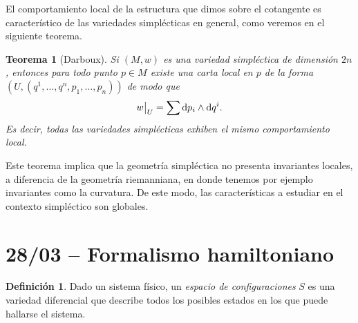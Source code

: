 \documentclass[11pt, a4paper]{article}
\theoremstyle{plain}
\newtheorem{thm}[prop]{Teorema}
\theoremstyle{definition}
\newtheorem{defn}[prop]{Definición}
\begin{document}
El comportamiento local de la estructura que dimos sobre el cotangente es característico de las variedades simplécticas en general, como veremos en el siguiente teorema.

\begin{thm}[Darboux] Si $(M,w)$ es una variedad simpléctica de dimensión $2n$, entonces para todo punto $p\in M$ existe una carta local en $p$ de la forma $\left(U, (q^1,\dots,q^n,p_1,\dots,p_n)\right)$ de modo que
\[w\big{|}_U = \sum \mathrm{d}p_i\wedge \mathrm{d}q^i.\]
Es decir, todas las variedades simplécticas exhiben el mismo comportamiento local. \hfill\qedsymbol
\end{thm}

Este teorema implica que la geometría simpléctica no presenta invariantes locales, a diferencia de la geometría riemanniana, en donde tenemos por ejemplo invariantes como la curvatura. De este modo, las características a estudiar en el contexto simpléctico son globales.

\section{28/03 -- Formalismo hamiltoniano}

\begin{defn} Dado un sistema físico, un \emph{espacio de configuraciones} $S$ es una variedad diferencial que describe todos los posibles estados en los que puede hallarse el sistema.
\end{defn}
\end{document}
